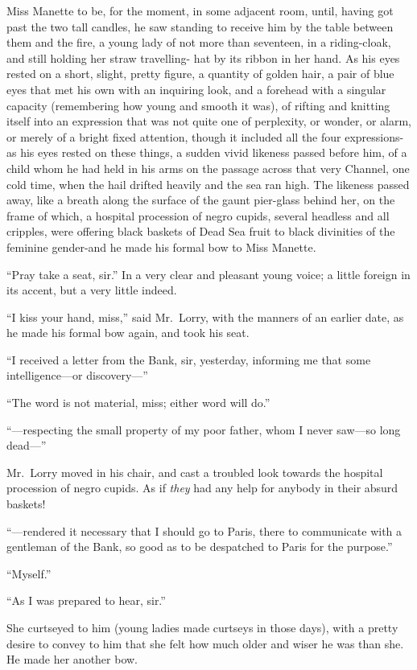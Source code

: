 Miss Manette to be, for the moment, in some adjacent room, until,
having got past the two tall candles, he saw standing to receive him
by the table between them and the fire, a young lady of not more than
seventeen, in a riding-cloak, and still holding her straw travelling-%
hat by its ribbon in her hand.  As his eyes rested on a short, slight,
pretty figure, a quantity of golden hair, a pair of blue eyes that
met his own with an inquiring look, and a forehead with a singular
capacity (remembering how young and smooth it was), of rifting and
knitting itself into an expression that was not quite one of perplexity,
or wonder, or alarm, or merely of a bright fixed attention, though it
included all the four expressions-as his eyes rested on these things,
a sudden vivid likeness passed before him, of a child whom he had
held in his arms on the passage across that very Channel, one cold
time, when the hail drifted heavily and the sea ran high.  The
likeness passed away, like a breath along the surface of the gaunt
pier-glass behind her, on the frame of which, a hospital procession
of negro cupids, several headless and all cripples, were offering
black baskets of Dead Sea fruit to black divinities of the feminine
gender-and he made his formal bow to Miss Manette.

``Pray take a seat, sir.''  In a very clear and pleasant young voice;
a little foreign in its accent, but a very little indeed.

``I kiss your hand, miss,'' said Mr.\ Lorry, with the manners of an
earlier date, as he made his formal bow again, and took his seat.

``I received a letter from the Bank, sir, yesterday, informing me that
some intelligence---or discovery---''

``The word is not material, miss; either word will do.''

``---respecting the small property of my poor father, whom I never
saw---so long dead---''

Mr.\ Lorry moved in his chair, and cast a troubled look towards the
hospital procession of negro cupids.  As if \emph{they} had any help for
anybody in their absurd baskets!

``---rendered it necessary that I should go to Paris, there to
communicate with a gentleman of the Bank, so good as to be despatched
to Paris for the purpose.''

``Myself.''

``As I was prepared to hear, sir.''

She curtseyed to him (young ladies made curtseys in those days), with
a pretty desire to convey to him that she felt how much older and
wiser he was than she.  He made her another bow.

